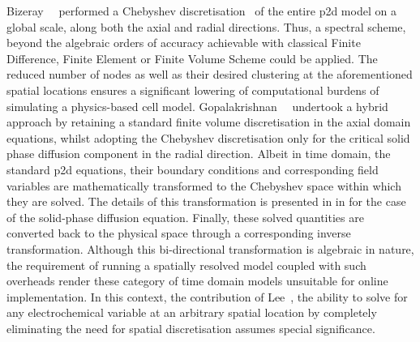 Bizeray~\etal{}~\cite{Bizeray2015}         performed         a         Chebyshev
discretisation~\cite{Trefethen2000}  of   the  entire   \gls{p2d}  model   on  a
global  scale,  \ie{}  along  both   the  axial  and  radial  directions.  Thus,
a  spectral  scheme,   beyond  the  algebraic  orders   of  accuracy  achievable
with  classical  Finite  Difference,  Finite Element  or  Finite  Volume  Scheme
could  be  applied.  The reduced  number  of  nodes  as  well as  their  desired
clustering  at  the  aforementioned  spatial  locations  ensures  a  significant
lowering  of computational  burdens of  simulating a  physics-based cell  model.
Gopalakrishnan~\etal{}~\cite{Gopalakrishnan2018} undertook a  hybrid approach by
retaining a standard finite volume discretisation in the axial domain equations,
whilst adopting the  Chebyshev discretisation only for the  critical solid phase
diffusion component in the radial direction. Albeit in time domain, the standard
\gls{p2d} equations, their boundary conditions and corresponding field variables
are  mathematically transformed  to the  Chebyshev space  within which  they are
solved.  The details  of this  transformation is  presented in   in   for  the case  of the  solid-phase diffusion
equation.  Finally,   these  solved  quantities   are  converted  back   to  the
physical  space through  a corresponding  inverse transformation.  Although this
bi-directional transformation is algebraic in nature, the requirement of running
a spatially resolved model coupled with  such overheads render these category of
time domain  models unsuitable for  online implementation. In this  context, the
contribution of Lee~\etal{}, \ie{} the  ability to solve for any electrochemical
variable at an arbitrary spatial location by completely eliminating the need for
spatial discretisation assumes special significance.


